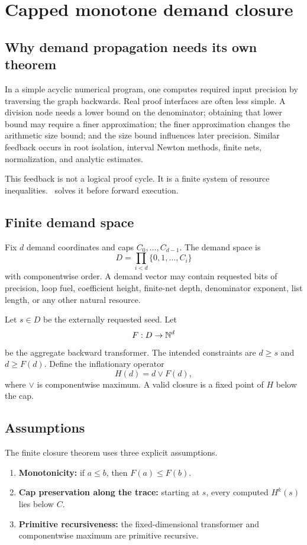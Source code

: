 \section{Capped monotone demand closure}
\label{sec:demand-closure}

\subsection{Why demand propagation needs its own theorem}

In a simple acyclic numerical program, one computes required input precision by traversing the graph backwards.  Real proof interfaces are often less simple.  A division node needs a lower bound on the denominator; obtaining that lower bound may require a finer approximation; the finer approximation changes the arithmetic size bound; and the size bound influences later precision.  Similar feedback occurs in root isolation, interval Newton methods, finite nets, normalization, and analytic estimates.

This feedback is not a logical proof cycle.  It is a finite system of resource inequalities.  \CIFER\ solves it before forward execution.

\subsection{Finite demand space}

Fix \(d\) demand coordinates and caps \(C_0,\ldots,C_{d-1}\).  The demand space is
\[
 D=\prod_{i<d}\{0,1,\ldots,C_i\}
\]
with componentwise order.  A demand vector may contain requested bits of precision, loop fuel, coefficient height, finite-net depth, denominator exponent, list length, or any other natural resource.

Let \(s\in D\) be the externally requested seed.  Let
\[
 F:D\to\mathbb{N}^d
\]
be the aggregate backward transformer.  The intended constraints are \(d\ge s\) and \(d\ge F(d)\).  Define the inflationary operator
\[
 H(d)=d\vee F(d),
\]
where \(\vee\) is componentwise maximum.  A valid closure is a fixed point of \(H\) below the cap.

\subsection{Assumptions}

The finite closure theorem uses three explicit assumptions.

\begin{enumerate}
\item \textbf{Monotonicity:} if \(a\le b\), then \(F(a)\le F(b)\).
\item \textbf{Cap preservation along the trace:} starting at \(s\), every computed \(H^k(s)\) lies below \(C\).
\item \textbf{Primitive recursiveness:} the fixed-dimensional transformer and componentwise maximum are primitive recursive.
\end{enumerate}

